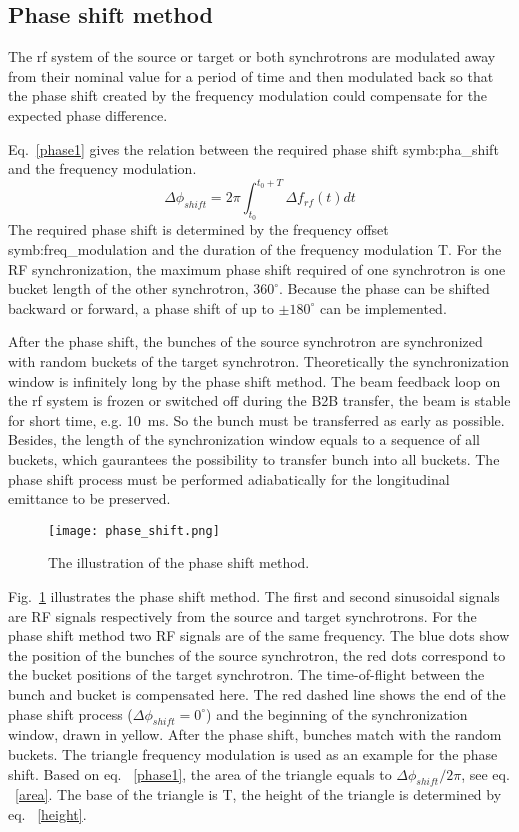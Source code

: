 \subsection{Phase shift method}

The rf system of the source or target or both synchrotrons are modulated away from their nominal value for a period of time and then modulated back so that the phase shift created by the frequency modulation could compensate for the expected phase difference. 

Eq.~\ref{phase1} gives the relation between the required phase shift \gls{symb:pha_shift} and the frequency modulation. 
\begin{equation}
\Delta \phi_{shift}= 2\pi \int_{t_0}^{t_0+T} \Delta f_{rf}(t)dt \label{phase1}
\end{equation}
The required phase shift is determined by the frequency offset \gls{symb:freq_modulation} and the duration of the frequency modulation T. For the RF synchronization, the maximum phase shift required of one synchrotron is one bucket length of the other synchrotron, $360^\circ$. Because the phase can be shifted backward or forward, a phase shift of up to $\pm 180^\circ$ can be implemented. 

After the phase shift, the bunches of the source synchrotron are synchronized with random buckets of the target synchrotron. Theoretically the synchronization window is infinitely long by the phase shift method. The beam feedback loop on the rf system is frozen or switched off during the B2B transfer, the beam is stable for short time, e.g. \SI{10}{ms}. So the bunch must be transferred as early as possible. Besides, the length of the synchronization window equals to a sequence of all buckets, which gaurantees the possibility to transfer bunch into all buckets. The phase shift process must be performed adiabatically for the longitudinal emittance to be preserved. 

\begin{figure}[!htb]
   \centering   
   \texttt{[image: phase\_shift.png]}
   \caption{The illustration of the phase shift method.}
   \label{phase_shift}
\end{figure}


Fig.~\ref{phase_shift} illustrates the phase shift method. The first and second sinusoidal signals are RF signals respectively from the source and target synchrotrons. For the phase shift method two RF signals are of the same frequency. The blue dots show the position of the bunches of the source synchrotron, the red dots correspond to the bucket positions of the target synchrotron. The time-of-flight between the bunch and bucket is compensated here. The red dashed line shows the end of the phase shift process ($\Delta \phi_{shift}=0^\circ$) and the beginning of the synchronization window, drawn in yellow. After the phase shift, bunches match with the random buckets. The triangle frequency modulation is used as an example for the phase shift. Based on eq. ~\ref{phase1}, the area of the triangle equals to $\Delta \phi_{shift}/2\pi$, see eq. ~\ref{area}. The base of the triangle is T, the height of the triangle is determined by eq. ~\ref{height}.  

